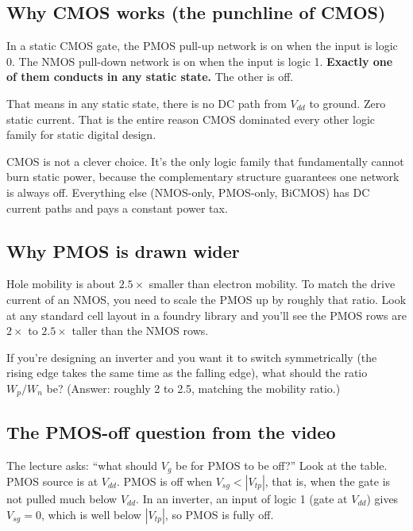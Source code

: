 \documentclass[11pt]{article}
\begin{document}
\subsection{Why CMOS works (the punchline of CMOS)}

In a static CMOS gate, the PMOS pull-up network is on when the input is logic 0. The NMOS pull-down network is on when the input is logic 1. \textbf{Exactly one of them conducts in any static state.} The other is off.

That means in any static state, there is no DC path from $V_{dd}$ to ground. Zero static current. That is the entire reason CMOS dominated every other logic family for static digital design.

\begin{keyidea}
CMOS is not a clever choice. It's the only logic family that fundamentally cannot burn static power, because the complementary structure guarantees one network is always off. Everything else (NMOS-only, PMOS-only, BiCMOS) has DC current paths and pays a constant power tax.
\end{keyidea}

\subsection{Why PMOS is drawn wider}

Hole mobility is about $2.5\times$ smaller than electron mobility. To match the drive current of an NMOS, you need to scale the PMOS up by roughly that ratio. Look at any standard cell layout in a foundry library and you'll see the PMOS rows are $2\times$ to $2.5\times$ taller than the NMOS rows.

\begin{gut}
If you're designing an inverter and you want it to switch symmetrically (the rising edge takes the same time as the falling edge), what should the ratio $W_p/W_n$ be? (Answer: roughly 2 to 2.5, matching the mobility ratio.)
\end{gut}

\subsection{The PMOS-off question from the video}

The lecture asks: ``what should $V_g$ be for PMOS to be off?'' Look at the table. PMOS source is at $V_{dd}$. PMOS is off when $V_{sg} < |V_{tp}|$, that is, when the gate is not pulled much below $V_{dd}$. In an inverter, an input of logic 1 (gate at $V_{dd}$) gives $V_{sg} = 0$, which is well below $|V_{tp}|$, so PMOS is fully off.
\end{document}
